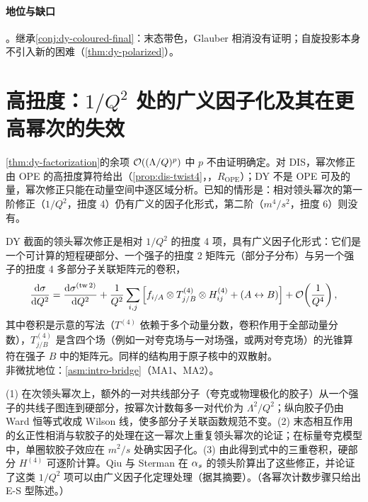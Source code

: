 \paragraph{地位与缺口}\tagC。继承\cref{conj:dy-coloured-final}：末态带色，Glauber 相消没有证明；自旋投影本身不引入新的困难（\cref{thm:dy-polarized}）。

\section{高扭度：\texorpdfstring{$1/Q^2$}{1/Q2} 处的广义因子化及其在更高幂次的失效}\label{sec:dy-twist}

\cref{thm:dy-factorization}的余项 $\mathcal{O}\!\left((\Lambda/Q)^p\right)$ 中 $p$ 不由证明确定。对 DIS，幂次修正由 OPE 的高扭度算符给出（\cref{prop:dis-twist4}，\tagR，$R_{\mathrm{OPE}}$）；DY 不是 OPE 可及的量，幂次修正只能在动量空间中逐区域分析。已知的情形是：相对领头幂次的第一阶修正（$1/Q^2$，扭度 4）仍有广义的因子化形式，第二阶（$m^4/s^2$，扭度 6）则没有。

\begin{theorem}\label{thm:dy-higher-twist}
DY 截面的领头幂次修正是相对 $1/Q^2$ 的扭度 4 项，具有广义因子化形式：它们是一个可计算的短程硬部分、一个强子的扭度 2 矩阵元（部分子分布）与另一个强子的扭度 4 多部分子关联矩阵元的卷积，
\[
\frac{\mathrm{d}\sigma}{\mathrm{d} Q^2}=\frac{\mathrm{d}\sigma^{(\rm tw\,2)}}{\mathrm{d} Q^2}+\frac{1}{Q^2}\sum_{i,j}\Big[f_{i/A}\otimes T^{(4)}_{j/B}\otimes H^{(4)}_{ij}+(A\leftrightarrow B)\Big]+\mathcal{O}\!\left(\frac{1}{Q^4}\right),
\]
其中卷积是示意的写法（$T^{(4)}$ 依赖于多个动量分数，卷积作用于全部动量分数），$T^{(4)}_{j/B}$ 是含四个场（例如一对夸克场与一对场强，或两对夸克场）的光锥算符在强子 $B$ 中的矩阵元\cite{QiuSterman1991a,QiuSterman1991b}。同样的结构用于原子核中的双散射\cite{Kastella:1989ux}。\\
非微扰地位：\cref{asm:intro-bridge}（MA1、MA2）。
\end{theorem}

\begin{proofsketch}
(1) 在次领头幂次上，额外的一对共线部分子（夸克或物理极化的胶子）从一个强子的共线子图连到硬部分，按幂次计数每多一对代价为 $\Lambda^2/Q^2$；纵向胶子仍由 Ward 恒等式收成 Wilson 线，使多部分子关联函数规范不变。(2) 末态相互作用的幺正性相消与软胶子的处理在这一幂次上重复领头幂次的论证；在标量夸克模型中，单圈软胶子效应在 $m^2/s$ 处确实因子化\cite{Basu:1984ba}。(3) 由此得到式中的三重卷积，硬部分 $H^{(4)}$ 可逐阶计算。Qiu 与 Sterman 在 $\alpha_s$ 的领头阶算出了这些修正，并论证了这类 $1/Q^2$ 项可以由广义因子化定理处理\cite{QiuSterman1991a,QiuSterman1991b}（据其摘要）。（各幂次计数步骤只给出 E-S 型陈述。）
\end{proofsketch}

